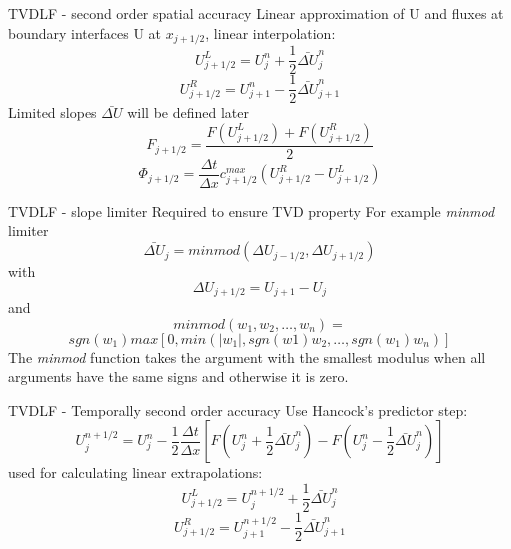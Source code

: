 	
\begin{frame}{TVDLF - second order spatial accuracy}
	Linear approximation of U and fluxes at boundary interfaces \newline
	U at $x_{j+1/2}$, linear interpolation:
	\begin{equation*}
		U_{j+1/2}^L = U_j^n + \frac{1}{2} \bar{\Delta U}_j^n
	\end{equation*}
	\begin{equation*}
		U_{j+1/2}^R = U_{j+1}^n - \frac{1}{2} \bar{\Delta U}_{j+1}^n
	\end{equation*}
	Limited slopes $\bar{\Delta U}$ will be defined later
	\begin{equation*}
		F_{j+1/2} = \frac{F(U_{j+1/2}^L) + F(U_{j+1/2}^R)}{2}
	\end{equation*}
	\begin{equation*}
		\Phi_{j+1/2} = \frac{\Delta t}{\Delta x} c_{j+1/2}^{max} \left( U_{j+1/2}^R-U_{j+1/2}^L \right)
	\end{equation*}
\end{frame}

\begin{frame}{TVDLF - slope limiter}
	Required to ensure TVD property \newline
	For example \textit{minmod} limiter
	\begin{equation*}
	\bar{\Delta U}_j = minmod(\Delta U_{j-1/2},\Delta U_{j+1/2})
	\end{equation*}
	with
	\begin{equation*}
		\Delta U_{j+1/2} = U_{j+1} - U_j
	\end{equation*}
	and
	\begin{equation*}
		minmod(w_1,w_2,\ldots,w_n) = 
	\end{equation*}
	\begin{equation*}
		sgn(w_1) max [0,min(|w_1|,sgn(w1)w_2,\ldots,sgn(w_1)w_n)]
	\end{equation*}	
	The \textit{minmod} function takes the argument with the smallest modulus when all arguments have the same signs and otherwise it is zero.
\end{frame}

\begin{frame}{TVDLF - Temporally second order accuracy}
	Use Hancock's predictor step:
	\begin{equation*}
		U_j^{n+1/2} = U_j^n - \frac{1}{2} \frac{\Delta t}{\Delta x} \left[ F(U_j^n+\frac{1}{2} \bar{\Delta U}_j^n) - F(U_j^n-\frac{1}{2} \bar{\Delta U}_j^n) \right]
	\end{equation*}
	used for calculating linear extrapolations:
	\begin{equation*}
	U_{j+1/2}^L = U_j^{n+1/2} + \frac{1}{2} \bar{\Delta U}_j^n
	\end{equation*}
	\begin{equation*}
	U_{j+1/2}^R = U_{j+1}^{n+1/2} - \frac{1}{2} \bar{\Delta U}_{j+1}^n
	\end{equation*}
\end{frame}

